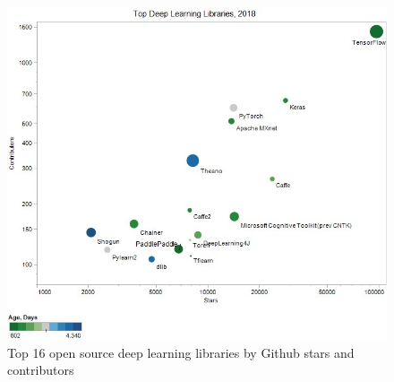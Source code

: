 \begin{figure}[!h]
	\centering
	\includegraphics[scale=0.65]{images/trend_deep_learning_libs_2018}
	\caption{Top 16 open source deep learning libraries by Github stars and contributors}
	\label{figtrendslibs}
\end{figure}

